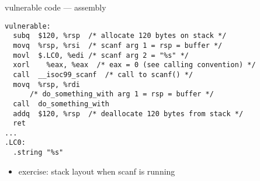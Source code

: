 \begin{frame}[fragile,label=vulnAsm]{vulnerable code --- assembly}
\lstset{language=myasm,style=small}
\begin{lstlisting}
vulnerable:
  subq	$120, %rsp  /* allocate 120 bytes on stack */
  movq	%rsp, %rsi  /* scanf arg 1 = rsp = buffer */
  movl	$.LC0, %edi /* scanf arg 2 = "%s" */
  xorl    %eax, %eax  /* eax = 0 (see calling convention) */
  call	__isoc99_scanf  /* call to scanf() */
  movq	%rsp, %rdi
      /* do_something_with arg 1 = rsp = buffer */
  call	do_something_with
  addq	$120, %rsp  /* deallocate 120 bytes from stack */
  ret
...
.LC0:
  .string "%s"
\end{lstlisting}
\begin{itemize}
\item<2> exercise: stack layout when scanf is running
\end{itemize}
\end{frame}

